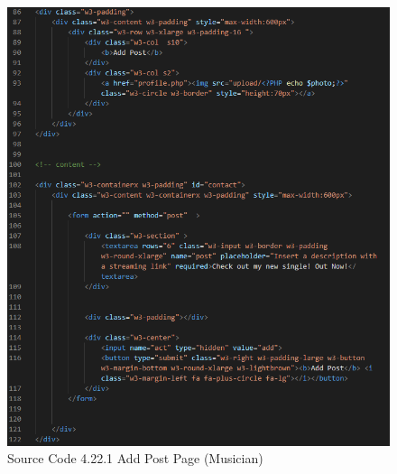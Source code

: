 \begin{enumerate}[1.]
\begin{figure}[h]
        \includegraphics[width=0.8\linewidth]{mainmatter/images/frontend/code/maddpost.png}
        \caption*{Source Code 4.22.1 Add Post Page (Musician)}
        \label{fig:myfig61a}
    \end{figure}
    \clearpage


\end{enumerate}
